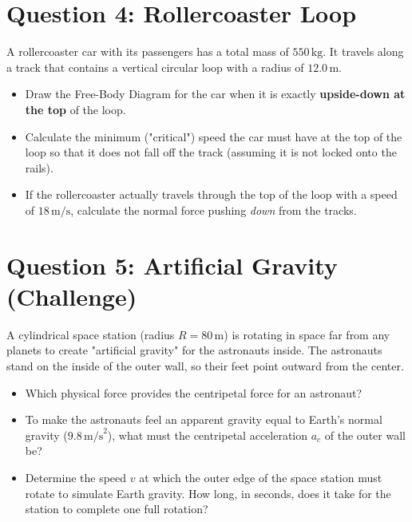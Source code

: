 \documentclass[12pt]{article}
\begin{document}
\newpage

\section*{Question 4: Rollercoaster Loop}

A rollercoaster car with its passengers has a total mass of $550 \, \text{kg}$. It travels along a track that contains a vertical circular loop with a radius of $12.0 \, \text{m}$.

\begin{itemize}
\item[(a)] Draw the Free-Body Diagram for the car when it is exactly \textbf{upside-down at the top} of the loop.
\vspace{5cm}

\item[(b)] Calculate the minimum ("critical") speed the car must have at the top of the loop so that it does not fall off the track (assuming it is not locked onto the rails).
\vspace{6cm}

\item[(c)] If the rollercoaster actually travels through the top of the loop with a speed of $18 \, \text{m/s}$, calculate the normal force pushing \textit{down} from the tracks.
\vspace{6cm}

\end{itemize}

\newpage

\section*{Question 5: Artificial Gravity (Challenge)}

A cylindrical space station (radius $R = 80 \, \text{m}$) is rotating in space far from any planets to create "artificial gravity" for the astronauts inside. The astronauts stand on the inside of the outer wall, so their feet point outward from the center.

\begin{itemize}
\item[(a)] Which physical force provides the centripetal force for an astronaut? 
\vspace{4cm}

\item[(b)] To make the astronauts feel an apparent gravity equal to Earth's normal gravity ($9.8 \, \text{m/s}^2$), what must the centripetal acceleration $a_c$ of the outer wall be?
\vspace{5cm}

\item[(c)] Determine the speed $v$ at which the outer edge of the space station must rotate to simulate Earth gravity. How long, in seconds, does it take for the station to complete one full rotation?
\vspace{8cm}

\end{itemize}
\end{document}
